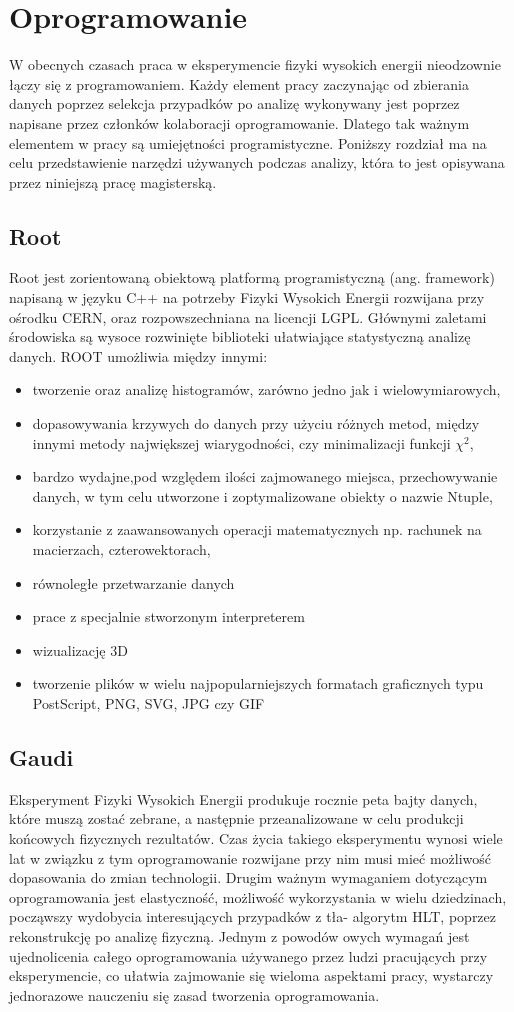 \chapter{Oprogramowanie}
W obecnych czasach praca w eksperymencie fizyki wysokich energii nieodzownie łączy się z programowaniem. Każdy element pracy zaczynając od zbierania danych poprzez selekcja przypadków po analizę wykonywany jest poprzez napisane przez członków kolaboracji oprogramowanie. Dlatego tak ważnym elementem w pracy są umiejętności programistyczne. Poniższy rozdział ma na celu przedstawienie narzędzi używanych podczas analizy, która to jest opisywana przez niniejszą pracę magisterską.

\section{Root}
Root \cite{ROOT} jest zorientowaną obiektową platformą programistyczną (ang. framework) napisaną w języku C++ na potrzeby Fizyki Wysokich Energii rozwijana przy ośrodku CERN, oraz rozpowszechniana na licencji LGPL. Głównymi zaletami środowiska są wysoce rozwinięte biblioteki ułatwiające statystyczną analizę danych. ROOT umożliwia między innymi:
\begin{itemize}
 \item tworzenie oraz analizę histogramów, zarówno jedno jak i wielowymiarowych,
 \item dopasowywania krzywych do danych przy użyciu różnych metod, między innymi metody największej wiarygodności, czy minimalizacji funkcji $\chi^2 $,
\item bardzo wydajne,pod względem ilości zajmowanego miejsca, przechowywanie danych, w tym celu utworzone i zoptymalizowane obiekty o nazwie Ntuple,
\item korzystanie z zaawansowanych operacji matematycznych np. rachunek na macierzach, czterowektorach,
\item równoległe przetwarzanie danych
\item prace z specjalnie stworzonym interpreterem 
\item wizualizację 3D
\item tworzenie plików w wielu najpopularniejszych formatach graficznych typu  PostScript, PNG, SVG, JPG czy GIF
 \end{itemize}
 \section{Gaudi}
 Eksperyment Fizyki Wysokich Energii produkuje rocznie peta bajty danych, które muszą zostać zebrane, a następnie przeanalizowane w celu produkcji końcowych fizycznych rezultatów. Czas życia takiego eksperymentu wynosi wiele lat w związku z tym oprogramowanie rozwijane przy nim musi mieć możliwość dopasowania do zmian technologii. Drugim ważnym wymaganiem dotyczącym oprogramowania jest elastyczność, możliwość wykorzystania w wielu dziedzinach, począwszy wydobycia interesujących przypadków z tła- algorytm HLT, poprzez rekonstrukcję po analizę fizyczną. Jednym z powodów owych wymagań jest ujednolicenia całego oprogramowania używanego przez ludzi pracujących przy eksperymencie, co ułatwia  zajmowanie się wieloma aspektami pracy, wystarczy jednorazowe nauczeniu się zasad tworzenia oprogramowania. 
 
